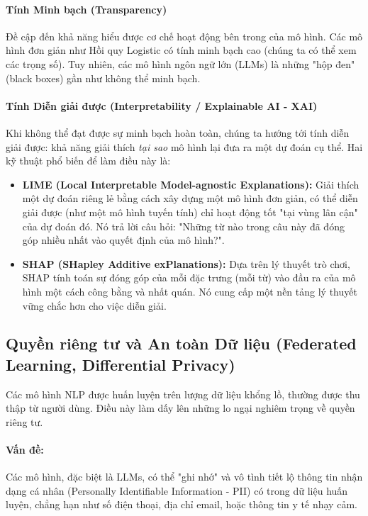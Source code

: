 \paragraph{Tính Minh bạch (Transparency)}
Đề cập đến khả năng hiểu được cơ chế hoạt động bên trong của mô hình. Các mô hình đơn giản như Hồi quy Logistic có tính minh bạch cao (chúng ta có thể xem các trọng số). Tuy nhiên, các mô hình ngôn ngữ lớn (LLMs) là những "hộp đen" (black boxes) gần như không thể minh bạch.

\paragraph{Tính Diễn giải được (Interpretability / Explainable AI - XAI)}
Khi không thể đạt được sự minh bạch hoàn toàn, chúng ta hướng tới tính diễn giải được: khả năng giải thích \textit{tại sao} mô hình lại đưa ra một dự đoán cụ thể. Hai kỹ thuật phổ biến để làm điều này là:
\begin{itemize}
    \item \textbf{LIME (Local Interpretable Model-agnostic Explanations):} Giải thích một dự đoán riêng lẻ bằng cách xây dựng một mô hình đơn giản, có thể diễn giải được (như một mô hình tuyến tính) chỉ hoạt động tốt "tại vùng lân cận" của dự đoán đó. Nó trả lời câu hỏi: "Những từ nào trong câu này đã đóng góp nhiều nhất vào quyết định của mô hình?".
    \item \textbf{SHAP (SHapley Additive exPlanations):} Dựa trên lý thuyết trò chơi, SHAP tính toán sự đóng góp của mỗi đặc trưng (mỗi từ) vào đầu ra của mô hình một cách công bằng và nhất quán. Nó cung cấp một nền tảng lý thuyết vững chắc hơn cho việc diễn giải.
\end{itemize}

\subsection{Quyền riêng tư và An toàn Dữ liệu (Federated Learning, Differential Privacy)}
\label{ssec:quyen_rieng_tu}

Các mô hình NLP được huấn luyện trên lượng dữ liệu khổng lồ, thường được thu thập từ người dùng. Điều này làm dấy lên những lo ngại nghiêm trọng về quyền riêng tư.

\paragraph{Vấn đề:} Các mô hình, đặc biệt là LLMs, có thể "ghi nhớ" và vô tình tiết lộ thông tin nhận dạng cá nhân (Personally Identifiable Information - PII) có trong dữ liệu huấn luyện, chẳng hạn như số điện thoại, địa chỉ email, hoặc thông tin y tế nhạy cảm.

